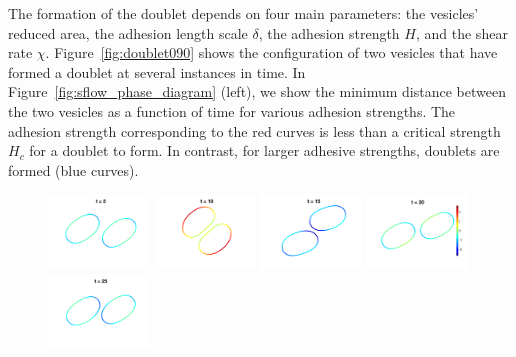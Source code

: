 \documentclass[prf,superscriptaddress,showpacs]{revtex4-1}
\begin{document}
The formation of the doublet depends on four main parameters: the
vesicles' reduced area, the adhesion length scale $\delta$, the adhesion
strength $H$, and the shear rate $\chi$.  Figure~\ref{fig:doublet090}
shows the configuration of two vesicles that have formed a doublet at
several instances in time.  In Figure~\ref{fig:sflow_phase_diagram}
(left), we show the minimum distance between the two vesicles as a
function of time for various adhesion strengths.  The adhesion strength
corresponding to the red curves is less than a critical strength $H_c$
for a doublet to form.  In contrast, for larger adhesive strengths,
doublets are formed (blue curves).

\begin{figure}[htp]
  \includegraphics[width=0.24\textwidth]{figs/adR4em1adS7em1Chi5em1_ra090_image01.png}
  \includegraphics[width=0.24\textwidth]{figs/adR4em1adS7em1Chi5em1_ra090_image02.png}
  \includegraphics[width=0.24\textwidth]{figs/adR4em1adS7em1Chi5em1_ra090_image03.png}
  \includegraphics[width=0.24\textwidth]{figs/adR4em1adS7em1Chi5em1_ra090_image04.png}
  \includegraphics[width=0.24\textwidth]{figs/adR4em1adS7em1Chi5em1_ra090_image05.png}

\end{figure}
\end{document}
